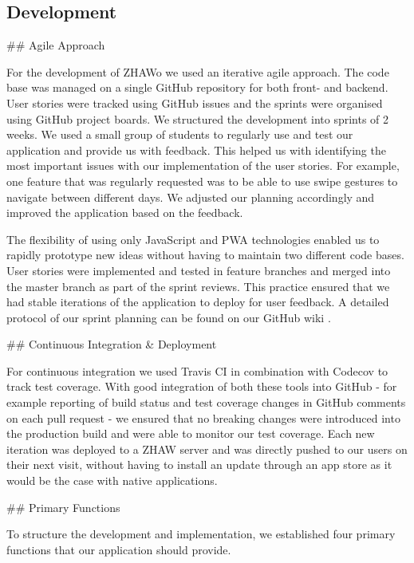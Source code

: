 \begin{markdown}
\section{Development} \label{development}

## Agile Approach

For the development of ZHAWo we used an iterative agile approach. The code base was managed on a single GitHub repository \cite{OurGithub} for both front- and backend. User stories were tracked using GitHub issues and the sprints were organised using GitHub project boards. We structured the development into sprints of 2 weeks. We used a small group of students to regularly use and test our application and provide us with feedback. This helped us with identifying the most important issues with our implementation of the user stories. For example, one feature that was regularly requested was to be able to use swipe gestures to navigate between different days. We adjusted our planning accordingly and improved the application based on the feedback.

The flexibility of using only JavaScript and PWA technologies enabled us to rapidly prototype new ideas without having to maintain two different code bases.
User stories were implemented and tested in feature branches and merged into the master branch as part of the sprint reviews. This practice ensured that we had stable iterations of the application to deploy for user feedback. A detailed protocol of our sprint planning can be found on our GitHub wiki \cite{OurWiki}.

## Continuous Integration \& Deployment

For continuous integration we used Travis CI \cite{Travis} in combination with Codecov \cite{Codecov} to track test coverage. With good integration of both these tools into GitHub - for example reporting of build status and test coverage changes in GitHub comments on each pull request - we ensured that no breaking changes were introduced into the production build and were able to monitor our test coverage.
Each new iteration was deployed to a ZHAW server \cite{OurHost} and was directly pushed to our users on their next visit, without having to install an update through an app store as it would be the case with native applications.

## Primary Functions

To structure the development and implementation, we established four primary functions that our application should provide.


\end{markdown}

